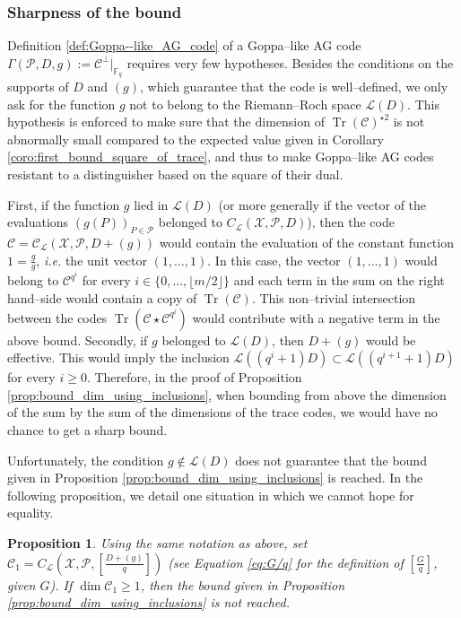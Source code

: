\documentclass[a4paper]{amsart}
\newtheorem{proposition}[thm]{Proposition}
\theoremstyle{definition}
\theoremstyle{remark}
\newcommand{\calP}{\mathcal{P}}
\newcommand{\calL}{\mathcal{L}}
\newcommand{\calC}{\mathcal{C}}
\newcommand{\calX}{\mathcal{X}}
\newcommand{\fq}{\mathbb{F}_{q}}
\newcommand{\Tr}[1]{\operatorname{Tr}\left(#1\right)}
\begin{document}
\subsubsection{Sharpness of the bound} \label{section:sharpness}

Definition \ref{def:Goppa--like_AG_code} of a Goppa--like AG code $\Gamma(\calP,D,g) := \calC^{\perp}|_{\fq}$ requires very few hypotheses. Besides the conditions on the supports of $D$ and $(g)$, which guarantee that the code is well--defined, we only ask for the function $g$ not to belong to the Riemann--Roch space $\calL(D)$. This hypothesis is enforced to make sure that the dimension of $\Tr{\calC}^{\star 2}$ is not abnormally small compared to the expected value given in Corollary \ref{coro:first_bound_square_of_trace}, and thus to make Goppa--like AG codes resistant to a distinguisher based on the square of their dual.

First, if the function $g$ lied in $\calL(D)$ (or more generally if the vector of the evaluations $(g(P))_{P \in \calP}$ belonged to $C_\calL(\calX,\calP,D)$), then the code $\calC= \calC_{\calL}(\calX,\calP,D+(g))$ would contain the evaluation of the constant function $1=\frac{g}{g}$, \textit{i.e.} the unit vector $(1,\dots,1)$. In this case, the vector $(1,\dots,1)$ would belong to $\calC^{q^i}$ for every $i \in \{0,\dots, \lfloor{m/2} \rfloor\}$ and each term in the sum on the right hand--side would contain a copy of $\Tr{\calC}$. This non--trivial intersection between the codes $\Tr{\calC\star \calC^{q^i}}$ would contribute with a negative term in the above bound.
Secondly, if $g$ belonged to $\calL(D)$, then $D+(g)$ would be effective. This would imply the inclusion $\calL((q^i+1)D) \subset \calL((q^{i+1}+1)D)$ for every $i \geq 0$. Therefore, in the proof of Proposition \ref{prop:bound_dim_using_inclusions}, when bounding from above the dimension of the sum by the sum of the dimensions of the trace codes, we would have no chance to get a sharp bound.

Unfortunately, the condition $g \notin \calL(D)$ does not guarantee that the bound given in Proposition \ref{prop:bound_dim_using_inclusions} is reached. In the following proposition, we detail one situation in which we cannot hope for equality.

\begin{proposition}\label{prop:non-eq}
	Using the same notation as above, set $\calC_1=C_{\calL}\left(\calX,\mathcal{P},\left[ \frac{D+(g)}{q} \right]\right)$ (see Equation \eqref{eq:G/q} for the definition of $\left[ \frac{G}{q} \right]$, given $G$). If $\dim \calC_1 \geq 1$, then the bound given in Proposition \ref{prop:bound_dim_using_inclusions} is not reached.
\end{proposition}
\end{document}
